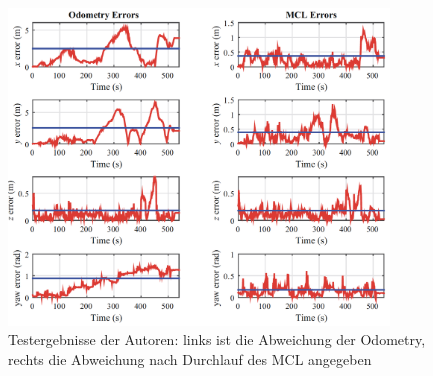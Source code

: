 \begin{figure}[ht]
    \centering
    \includegraphics[width=0.9\textwidth]{pic/loesungen/13_testergebnisse.png}
    \caption{Testergebnisse der Autoren: links ist die Abweichung der Odometry, rechts die Abweichung nach Durchlauf des MCL angegeben \cite{dreidimensionale_indoor_lokalisierung}}
    \label{fig:13_testergebnisse}
\end{figure}


